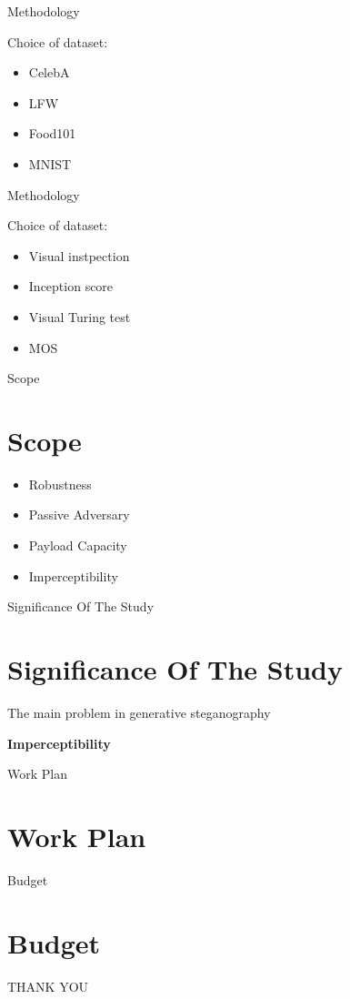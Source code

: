 \documentclass[11pt]{beamer}
\begin{document}
\begin{frame}{Methodology}

 Choice of dataset:
 \begin{itemize}
 	\item CelebA
 	\item LFW
 	\item Food101
 	\item MNIST
 \end{itemize}
\end{frame}

\begin{frame}{Methodology}
	
	Choice of dataset:
	\begin{itemize}
		\item Visual instpection
		\item Inception score
		\item Visual Turing test
		\item MOS
	\end{itemize}
\end{frame}

\begin{frame}{Scope}
\section{Scope}
\begin{itemize}
	\item <1-> Robustness
	\item <2-> Passive Adversary
	\item <3-> Payload Capacity
	\item <4-> Imperceptibility
\end{itemize}
\end{frame}

\begin{frame}{Significance Of The Study}
\section{Significance Of The Study}
	The main problem in generative steganography 
	
	\begin{center}
		\textbf{Imperceptibility}
	\end{center}
\end{frame}


\begin{frame}{Work Plan}
\section{Work Plan}

\end{frame}

\begin{frame}{Budget}
\section{Budget}

\end{frame}

\begin{frame}
\begin{center}
\LARGE
THANK YOU
\end{center}
\end{frame}
\end{document}
